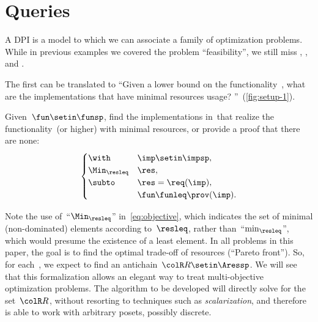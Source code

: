 
\clearpage

\section{Queries}
\label{sec:design-problems-querying}

A DPI is a model to which we can associate a family of optimization problems.
While in previous examples we covered the problem ``feasibility'', we still miss \FixFunMinRes, \FixResMaxFun, and \FeasibleImp.

The first can be translated to ``Given a lower bound on the functionality~\fun, what are the implementations that have minimal resources usage?
''~(\cref{fig:setup-1}).

\begin{problem}[\FixFunMinRes]
\label{prob:FixFunMinRes}
Given~$\fun\setin\funsp$, find the implementations in~\impsp that realize the functionality~\fun (or higher) with minimal resources, or provide a proof that there are none:
\begin{equation}
    \label{eq:objective}
    \begin{cases}
        \with          & \imp\setin\impsp,       \\
        \Min_{\resleq} & \res,                   \\
        \subto         & \res=\req(\imp),        \\
                       & \fun\funleq\prov(\imp).
    \end{cases}
\end{equation}
\end{problem}

\begin{figure*}
    \centering
    \caption{}
    \label{fig:setup-1}
\end{figure*}

\begin{remark}
    Note the use of~``$\Min_{\resleq}$'' in~\cref{eq:objective},
    which indicates the set of minimal (non-dominated) elements according to~$\resleq$, rather than~``$\min_{\resleq}$'', which would presume the existence of a least element.
    In all problems in this paper, the goal is to find the optimal trade-off of resources (``Pareto front'').
    So, for each~\fun, we expect to find an antichain~${\colR R}\setin\Aressp$.
    We will see that this formalization allows an elegant way to treat multi-objective optimization problems.
    The algorithm to be developed will directly solve for the set~${\colR R}$, without resorting to techniques such as \emph{scalarization}, and therefore is able to work with arbitrary posets, possibly discrete.
\end{remark}

